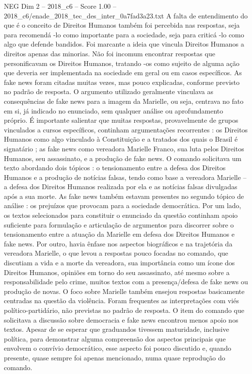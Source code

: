 \begin{textsample}{NEG Dim 2 – 2018\_c6 – Score 1.00 – 2018\_c6/enade\_2018\_tec\_des\_inter\_0a7fad3a23.txt}
A falta de entendimento do que é o conceito de Direitos Humanos também foi percebida nas respostas, seja para recomendá -lo como importante para a sociedade, seja para criticá -lo como algo que defende bandidos.
Foi marcante a ideia que vincula Direitos Humanos a direitos apenas das minorias.
Não foi incomum encontrar respostas que personificavam os Direitos Humanos, tratando -os como sujeito de alguma ação que deveria ser implementada na sociedade em geral ou em casos específicos.
As fake news foram citadas muitas vezes, mas pouco explicadas, conforme previsto no padrão de resposta.
O argumento utilizado geralmente vinculava as consequências de fake news para a imagem da Marielle, ou seja, centrava no fato em si, já indicado no enunciado, sem qualquer análise ou aprofundamento próprio.
É importante salientar que muitas respostas, provavelmente de grupos vinculados a cursos específicos, continham argumentações recorrentes : os Direitos Humanos como algo vinculado à Constituição e a tratados dos quais o Brasil é signatário ; as fake news como vereadora Marielle Franco, sua luta pelos Direitos Humanos, seu assassinato, e a produção de fake news.
O comando solicitava um texto abordando dois tópicos : o tensionamento entre a defesa dos Direitos Humanos e a produção de notícias falsas, tendo como base a vereadora Marielle – a defesa dos Direitos Humanos realizada por ela e as notícias falsas divulgadas após a sua morte.
As fake news também estavam presentes no segundo tópico de análise : os prejuízos que provocam para a sociedade democrática.
Por um lado, os textos selecionados para constituir o enunciado da questão continham apoio suficiente para formulação e articulação de argumentos para discorrer sobre o tensionamento entre a atuação da Marielle em defesa dos Direitos Humanos e fake news.
Por outro, havia ênfase nos aspectos biográficos e na trajetória da vereadora Marielle, o que levou a respostas pouco focadas no comando, que discutiam a vida e a morte da vereadora, sua importância como um ícone dos Direitos Humanos, opiniões em torno do seu assassinato, até mesmo sobre a responsabilidade pelo crime, muitos textos com a presença/defesa de fake news ou produção de novas.
O foco sobre Marielle também ensejou respostas basicamente centradas na questão da violência.
Foram frequentes as interpretações com viés político-partidário, não previstas no padrão de resposta.
O item do comando que solicitava a discussão sobre democracia e fake news encontrou menos apoio nos textos.
Apesar de se esperar que graduandos tivessem maturidade, inclusive política, para demonstrar alguma compreensão dos aspectos principais que envolvem o convívio democrático, esse aspecto foi pouco discutido e, quando presente, quase sempre foi apenas mencionado, numa quase reprodução do comando.

\end{textsample}
